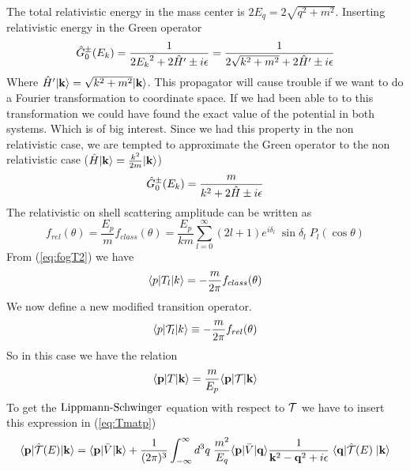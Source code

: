 The total relativistic energy in the mass center is $2E_q=2\sqrt{q^2+m^2}$. Inserting relativistic energy in the Green operator
\begin{equation}\label{eq:Grelativisjada}
{\op{G}^\pm_0(E_k)}=\frac{1}{{2E_k}^2+2{\op{H}'}\pm i\epsilon}=\frac{1}{2\sqrt{k^2+m^2}+2\op{H}'\pm i \epsilon}
\end{equation}
%
Where $\hat{H}'|{\bf k}\rangle=\sqrt{k^2+m^2}|{\bf k}\rangle$. This propagator
will cause trouble if we want to do a Fourier transformation to coordinate space. 
If we had been able to to this transformation we could have found the exact value of the potential in both systems. 
Which is of big interest. Since we had this property in the non relativistic case, we are tempted to approximate the 
Green operator to the non relativistic case ($\hat{H}|{\bf k}\rangle=\frac{k^2}{2m}|{\bf k}\rangle$)
\begin{equation}\label{eq:Gikkerelativis} 
{\op{G}^\pm_0(E_k)}=\frac{m}{{k}^2+2{\op{H}}\pm i\epsilon}
\end{equation}
%
%
The relativistic on shell scattering amplitude can be written as
\begin{equation}
f_{rel}(\theta)=\frac{{E_p}}{m}f_{class}(\theta)=\frac{E_p}{km}\sum^{\infty}_{l=0} (2l+1)e^{i\delta_l}\;\sin\delta_l\; P_{l}(\cos\theta)
\end{equation}
%
From (\ref{eq:fogT2}) we have
\begin{equation}
\langle p|T_l|k\rangle=-\frac{m}{2\pi}f_{class}(\theta)
\end{equation}
% 
We now define a new modified transition operator.
\begin{equation}
\langle p|{\cal{T}}_l|k\rangle\equiv-\frac{m}{2\pi}f_{rel}(\theta)
\end{equation}
%  
So in this case we have the relation
\begin{equation}
\langle{\bf p}|T|{\bf k}\rangle=\frac{m}{{E_p}}\langle{\bf p}|{\cal{T}}|{\bf k}\rangle
\end{equation}
%
To get the $\text{Lippmann-Schwinger}$ equation with respect to $\cal{T}$ we have to insert this expression in (\ref{eq:Tmatp}) %
\begin{equation}\label{eq:Blankenbecler-Sugar}
\braketm{{\bf p}} {\op{{\cal T}}(E)}{{\bf k}} =\braketm{{\bf p}}{\bar{V}}{{\bf k}}
+ \inv{(2\pi)^3}\int^{\infty}_{-\infty}d^3 { q}\;\frac{m^2}{E_q}\bra{{\bf p}}\bar{V}\ket{{\bf q}}
\inv{{\bf k}^2-{\bf q}^2+i\epsilon}   \;\bra{{\bf q}} \op{{\cal T}}(E)\;\ket{{\bf k}}
\end{equation}
